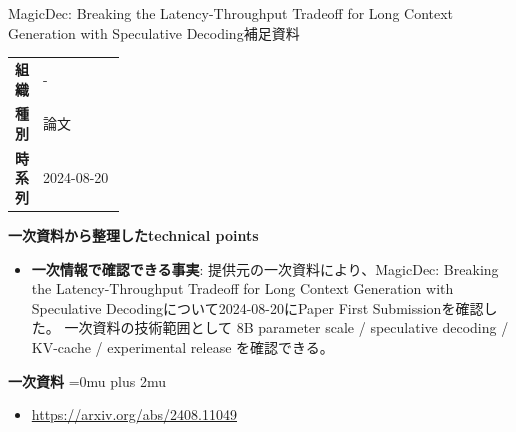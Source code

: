 \begin{technicalnote}{MagicDec: Breaking the Latency-Throughput Tradeoff for Long Context Generation with Speculative Decoding}{補足資料}
\begingroup
\begin{tabularx}{\linewidth}{@{}>{\bfseries}p{0.22\linewidth}X@{}}
組織 & - \\
種別 & 論文 \\
時系列 & 2024-08-20 \\
\end{tabularx}
\smallskip
{\bfseries 一次資料から整理したtechnical points}
\begin{itemize}[leftmargin=1.5em,itemsep=0.35em]
\item \textbf{一次情報で確認できる事実}: 提供元の一次資料により、MagicDec: Breaking the Latency-Throughput Tradeoff for Long Context Generation with Speculative Decodingについて2024-08-20にPaper First Submissionを確認した。 一次資料の技術範囲として 8B parameter scale / speculative decoding / KV-cache / experimental release を確認できる。
\end{itemize}
\begin{minipage}{\linewidth}
\begin{samepage}
{\bfseries 一次資料}
\begingroup\sloppy
\Urlmuskip=0mu plus 2mu\relax
\begin{itemize}[leftmargin=1.5em,itemsep=0.25em]
\item {\scriptsize\url{https://arxiv.org/abs/2408.11049}}
\end{itemize}
\endgroup
\end{samepage}
\end{minipage}
\endgroup
\end{technicalnote}
\medskip

